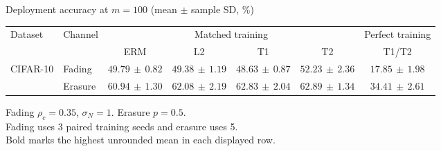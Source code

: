 \documentclass[border=4pt]{standalone}
\begin{document}
\begin{minipage}{7.8in}
\centering
Deployment accuracy at $m=100$ (mean $\pm$ sample SD, \%)\\[4pt]
\begin{tabular*}{\linewidth}{@{\extracolsep{\fill}}llccccc@{}}
\toprule
\multirow{2}{*}{Dataset} & \multirow{2}{*}{Channel} & \multicolumn{4}{c}{Matched training} & Perfect training \\
\cmidrule(lr){3-6}\cmidrule(l){7-7}
 & & ERM & L2 & T1 & T2 & T1/T2 \\
\midrule
\multirow{2}{*}{CIFAR-10} & Fading & $49.79\,\pm\,0.82$ & $49.38\,\pm\,1.19$ & $48.63\,\pm\,0.87$ & $\mathbf{52.23}\,\pm\,2.36$ & $17.85\,\pm\,1.98$ \\
 & Erasure & $60.94\,\pm\,1.30$ & $62.08\,\pm\,2.19$ & $62.83\,\pm\,2.04$ & $\mathbf{62.89}\,\pm\,1.34$ & $34.41\,\pm\,2.61$ \\
\bottomrule
\end{tabular*}
\par\smallskip\raggedright\footnotesize
Fading $\rho_c=0.35$, $\sigma_N=1$. Erasure $p=0.5$.\\
Fading uses 3 paired training seeds and erasure uses 5.\\
Bold marks the highest unrounded mean in each displayed row.
\end{minipage}
\end{document}
